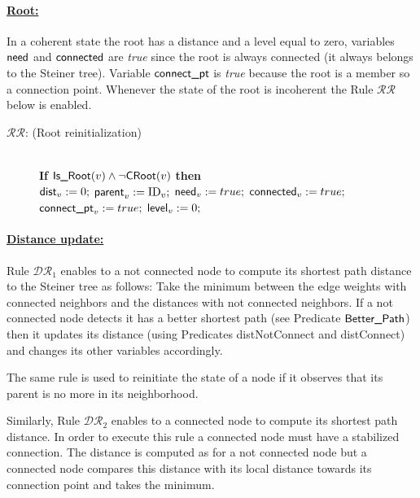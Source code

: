 \documentclass[11pt]{article}
\newcommand{\id}{\mbox{ID}}
\newcommand{\parent}{\mbox{\sf parent}}
\newcommand{\level}{\mbox{\sf level}}
\newcommand{\dist}{\mbox{\sf dist}}
\newcommand{\need}{\mbox{\sf need}}
\newcommand{\connect}{\mbox{\sf connected}}
\newcommand{\connectpt}{\mbox{\sf connect\_pt}}
\newcommand{\IsRoot}{\mbox{\sf Is\_Root}}
\newcommand{\CRoot}{\mbox{\sf CRoot}}
\newcommand{\distConnect}{\mbox{\sf distConnect}}
\newcommand{\distNotConnect}{\mbox{\sf distNotConnect}}
\newcommand{\Better}{\mbox{\sf Better\_Path}}
\newcommand{\ARA}{$\mathcal{DR}_1$}
\newcommand{\ARB}{$\mathcal{DR}_2$}
\newcommand{\CRA}{$\mathcal{RR}$}
\begin{document}
\paragraph{\underline{Root:}}

In a coherent state the root has a distance and a level equal to zero,
variables $\need$ and $\connect$ 
are \emph{true} since the root is always connected (it always belongs to the Steiner tree). Variable $\connectpt$ is \emph{true} because the root is a member so a connection point.
Whenever the state of the root is incoherent the Rule \CRA\/ below is enabled.
\begin{small}
\begin{description}
\item[\CRA: (Root reinitialization)]~\\\textbf{If} $\IsRoot(v) \wedge \neg \CRoot(v)$ \textbf{then}\\
\hspace*{0,8cm}$\dist_v:=0;$ $\parent_v:=\id_v;$ $\need_v:=true\/; $ $\connect_v:=true;$\\ 
\hspace*{0,8cm}$\connectpt_v:=true;$ $ \level_v:=0;$
\end{description}
\end{small}


\paragraph{\underline{Distance update:}} 

Rule \ARA\/ enables to a not connected node to compute its shortest path
distance to the Steiner tree 
as follows: Take the minimum between the edge weights with connected
neighbors and the distances 
with not connected neighbors. If a not connected node detects it has a
better 
shortest path (see Predicate $\Better$) then it updates its distance 
(using Predicates \distNotConnect\/ and \distConnect) and changes its
other variables accordingly. 

The same rule is used to reinitiate the state of a node if it observes that its parent is no more in its neighborhood.

Similarly, Rule \ARB\/ enables to a connected node to compute its
shortest path distance. In order to execute this rule 
a connected node must have a stabilized connection. The distance is
computed as for a not connected node but a connected node compares
this distance with its local distance towards its connection point and takes the minimum.
\end{document}

